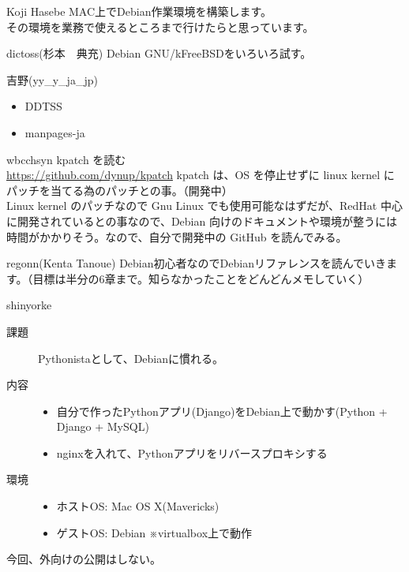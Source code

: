 \begin{prework}{ Koji Hasebe }
MAC上でDebian作業環境を構築します。\\
その環境を業務で使えるところまで行けたらと思っています。
\end{prework}

\begin{prework}{ dictoss(杉本　典充) }
Debian GNU/kFreeBSDをいろいろ試す。
\end{prework}

\begin{prework}{ 吉野(yy\_{}y\_{}ja\_{}jp) }
\begin{itemize}
\item DDTSS
\item manpages-ja
\end{itemize}
\end{prework}

\begin{prework}{ wbcchsyn }
kpatch を読む\\
\url{https://github.com/dynup/kpatch}
kpatch は、OS を停止せずに linux kernel にパッチを当てる為のパッチとの事。（開発中）\\

 Linux kernel のパッチなので Gnu Linux でも使用可能なはずだが、RedHat 中心に開発されているとの事なので、Debian 向けのドキュメントや環境が整うには時間がかかりそう。なので、自分で開発中の GitHub を読んでみる。
\end{prework}

\begin{prework}{ regonn(Kenta Tanoue) }
 Debian初心者なのでDebianリファレンスを読んでいきます。（目標は半分の6章まで。知らなかったことをどんどんメモしていく）
\end{prework}

\begin{prework}{ shinyorke }

\begin{description}
\item [課題] Pythonistaとして、Debianに慣れる。
\item [内容] 
\begin{itemize}
\item 自分で作ったPythonアプリ(Django)をDebian上で動かす(Python + Django + MySQL)
\item nginxを入れて、Pythonアプリをリバースプロキシする
\end{itemize}
\item [環境] 
\begin{itemize}
\item ホストOS: Mac OS X(Mavericks)
\item ゲストOS: Debian ※virtualbox上で動作
\end{itemize}
\end{description}
 今回、外向けの公開はしない。

\end{prework}

